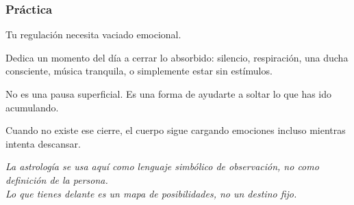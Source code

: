 \documentclass[11pt,a4paper]{article}
\begin{document}
\subsubsection*{Práctica}

Tu regulación necesita vaciado emocional.

Dedica un momento del día a cerrar lo absorbido:
silencio,
respiración,
una ducha consciente,
música tranquila,
o simplemente estar sin estímulos.

No es una pausa superficial.
Es una forma de ayudarte a soltar lo que has ido acumulando.

Cuando no existe ese cierre, el cuerpo sigue cargando emociones incluso mientras intenta descansar.

\vspace{0.6cm}

\begin{center}
{\small\itshape\color{grisai}
La astrología se usa aquí como lenguaje simbólico de observación, no como definición de la persona.\\
Lo que tienes delante es un mapa de posibilidades, no un destino fijo.
}
\end{center}
\end{document}
